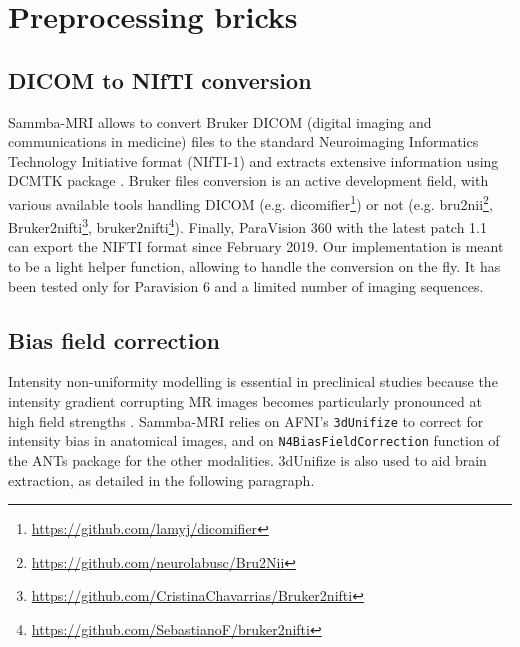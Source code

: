 \documentclass[utf8, a4paper, final, crop]{frontiersSCNS}
\newcommand{\bashinline}[1]{\texttt{#1}}
\begin{document}
\section{Preprocessing bricks}

\subsection{DICOM to NIfTI conversion}

Sammba-MRI allows to convert Bruker DICOM (digital imaging and communications in medicine) files to the standard  Neuroimaging Informatics Technology Initiative  format (NIfTI-1) and extracts extensive information using DCMTK package  \citep{eichelberg2004ten}. 
Bruker files conversion is an active development field,
with various available tools handling DICOM (e.g. 
dicomifier\footnote{\url{https://github.com/lamyj/dicomifier}}) or
not (e.g. bru2nii\footnote{\url{https://github.com/neurolabusc/Bru2Nii}},
Bruker2nifti\footnote{\url{https://github.com/CristinaChavarrias/Bruker2nifti}}, bruker2nifti\footnote{\url{https://github.com/SebastianoF/bruker2nifti}}).
Finally, ParaVision 360 with the latest patch 1.1 can export the NIFTI format since February 2019.
Our implementation is meant to be a light helper function, allowing to 
handle the conversion on the fly. It has been tested only for Paravision 6
and a limited number of imaging sequences.

\subsection{Bias field correction}

Intensity non-uniformity modelling is essential in preclinical studies
because the intensity gradient corrupting MR images becomes
particularly pronounced at high field strengths \citep{boyes2008intensity}.
Sammba-MRI relies on AFNI's \bashinline{3dUnifize} to correct for intensity bias in
anatomical images, and on \bashinline{N4BiasFieldCorrection} function
of the ANTs package \citep{tustison2010n4itk}
for the other modalities. 3dUnifize is also used to aid brain extraction,
as detailed in the following paragraph.
\end{document}

